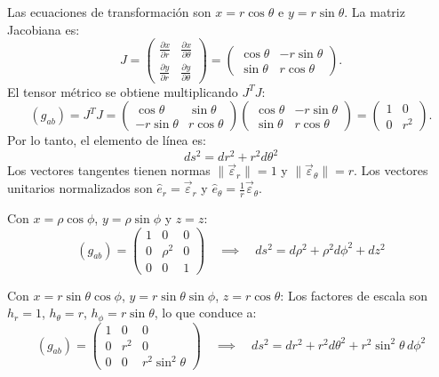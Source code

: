 \documentclass[11pt,letterpaper]{article}
\begin{document}
Las ecuaciones de transformación son $x = r\cos\theta$ e $y = r\sin\theta$.
La matriz Jacobiana es:
\[
J = \begin{pmatrix} \frac{\partial x}{\partial r} & \frac{\partial x}{\partial \theta} \\ \frac{\partial y}{\partial r} & \frac{\partial y}{\partial \theta} \end{pmatrix} = \begin{pmatrix} \cos\theta & -r\sin\theta \\ \sin\theta & r\cos\theta \end{pmatrix}.
\]
El tensor métrico se obtiene multiplicando $J^T J$:
\[
(g_{ab}) = J^T J = \begin{pmatrix} \cos\theta & \sin\theta \\ -r\sin\theta & r\cos\theta \end{pmatrix} \begin{pmatrix} \cos\theta & -r\sin\theta \\ \sin\theta & r\cos\theta \end{pmatrix} = \begin{pmatrix} 1 & 0 \\ 0 & r^2 \end{pmatrix}.
\]
Por lo tanto, el elemento de línea es:
\[
\boxed{ds^2 = dr^2 + r^2 d\theta^2}
\]
Los vectores tangentes tienen normas $\|\vec{\varepsilon}_r\| = 1$ y $\|\vec{\varepsilon}_\theta\| = r$. Los vectores unitarios normalizados son $\hat{e}_r = \vec{\varepsilon}_r$ y $\hat{e}_\theta = \frac{1}{r}\vec{\varepsilon}_\theta$.

Con $x = \rho\cos\phi$, $y = \rho\sin\phi$ y $z = z$:
\[
(g_{ab}) = \begin{pmatrix} 1 & 0 & 0 \\ 0 & \rho^2 & 0 \\ 0 & 0 & 1 \end{pmatrix} \quad \implies \quad \boxed{ds^2 = d\rho^2 + \rho^2 d\phi^2 + dz^2}
\]

Con $x = r\sin\theta\cos\phi$, $y = r\sin\theta\sin\phi$, $z = r\cos\theta$:
Los factores de escala son $h_r = 1$, $h_\theta = r$, $h_\phi = r\sin\theta$, lo que conduce a:
\[
(g_{ab}) = \begin{pmatrix} 1 & 0 & 0 \\ 0 & r^2 & 0 \\ 0 & 0 & r^2\sin^2\theta \end{pmatrix} \quad \implies \quad \boxed{ds^2 = dr^2 + r^2 d\theta^2 + r^2\sin^2\theta\,d\phi^2}
\]
\end{document}
